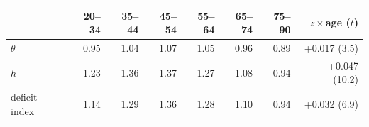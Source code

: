 \begin{tabular}{lrrrrrrr}
\toprule
 & 20--34 & 35--44 & 45--54 & 55--64 & 65--74 & 75--90 & $z\times$age ($t$) \\
\midrule
$\theta$ & 0.95 & 1.04 & 1.07 & 1.05 & 0.96 & 0.89 & +0.017 (3.5) \\
$h$ & 1.23 & 1.36 & 1.37 & 1.27 & 1.08 & 0.94 & +0.047 (10.2) \\
deficit index & 1.14 & 1.29 & 1.36 & 1.28 & 1.10 & 0.94 & +0.032 (6.9) \\
\bottomrule
\end{tabular}
